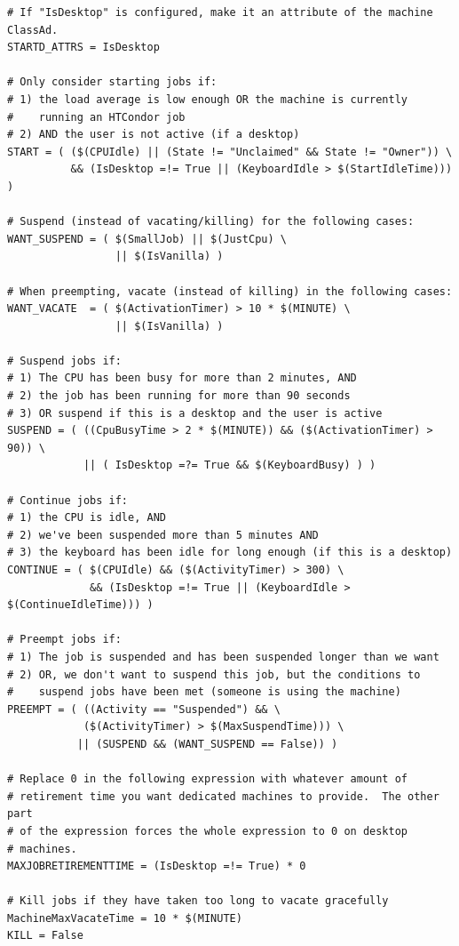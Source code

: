 \begin{verbatim}
# If "IsDesktop" is configured, make it an attribute of the machine ClassAd.
STARTD_ATTRS = IsDesktop

# Only consider starting jobs if:
# 1) the load average is low enough OR the machine is currently
#    running an HTCondor job
# 2) AND the user is not active (if a desktop)
START = ( ($(CPUIdle) || (State != "Unclaimed" && State != "Owner")) \
          && (IsDesktop =!= True || (KeyboardIdle > $(StartIdleTime))) )

# Suspend (instead of vacating/killing) for the following cases:
WANT_SUSPEND = ( $(SmallJob) || $(JustCpu) \
                 || $(IsVanilla) )

# When preempting, vacate (instead of killing) in the following cases:
WANT_VACATE  = ( $(ActivationTimer) > 10 * $(MINUTE) \
                 || $(IsVanilla) )

# Suspend jobs if:
# 1) The CPU has been busy for more than 2 minutes, AND
# 2) the job has been running for more than 90 seconds
# 3) OR suspend if this is a desktop and the user is active
SUSPEND = ( ((CpuBusyTime > 2 * $(MINUTE)) && ($(ActivationTimer) > 90)) \
            || ( IsDesktop =?= True && $(KeyboardBusy) ) )

# Continue jobs if:
# 1) the CPU is idle, AND 
# 2) we've been suspended more than 5 minutes AND
# 3) the keyboard has been idle for long enough (if this is a desktop)
CONTINUE = ( $(CPUIdle) && ($(ActivityTimer) > 300) \
             && (IsDesktop =!= True || (KeyboardIdle > $(ContinueIdleTime))) )

# Preempt jobs if:
# 1) The job is suspended and has been suspended longer than we want
# 2) OR, we don't want to suspend this job, but the conditions to
#    suspend jobs have been met (someone is using the machine)
PREEMPT = ( ((Activity == "Suspended") && \
            ($(ActivityTimer) > $(MaxSuspendTime))) \
           || (SUSPEND && (WANT_SUSPEND == False)) )

# Replace 0 in the following expression with whatever amount of
# retirement time you want dedicated machines to provide.  The other part
# of the expression forces the whole expression to 0 on desktop
# machines.
MAXJOBRETIREMENTTIME = (IsDesktop =!= True) * 0

# Kill jobs if they have taken too long to vacate gracefully
MachineMaxVacateTime = 10 * $(MINUTE)
KILL = False

\end{verbatim}

